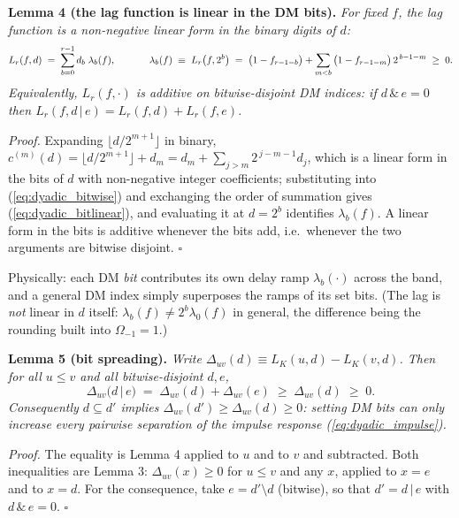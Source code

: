 \documentclass{article}
\numberwithin{equation}{section}   %
\begin{document}
\medskip
\par\noindent
{\bf Lemma 4 (the lag function is linear in the DM bits).}
{\em For fixed $f$, the lag function is a non-negative linear form in the binary digits of
$d$:}
\begin{equation}
L_r(f,d) \;=\; \sum_{b=0}^{r-1} d_b \; \lambda_b(f),
  \hspace{1.2cm}
\lambda_b(f) \;\equiv\; L_r\big(f, 2^b\big)
  \;=\; \big(1 - f_{r-1-b}\big) + \sum_{m<b} \big(1-f_{r-1-m}\big) \, 2^{\,b-1-m} \;\ge\; 0.
\label{eq:dyadic_bitlinear}
\end{equation}
{\em Equivalently, $L_r(f,\cdot)$ is additive on bitwise-disjoint DM indices: if
$d \,\&\, e = 0$ then $L_r(f, d\,|\,e) = L_r(f,d) + L_r(f,e)$.}

\medskip
\par\noindent
{\em Proof.} Expanding $\lfloor d/2^{m+1}\rfloor$ in binary,
$c^{(m)}(d) = \lfloor d/2^{m+1}\rfloor + d_m = d_m + \sum_{j>m} 2^{\,j-m-1} d_j$,
which is a linear form in the bits of $d$ with
non-negative integer coefficients; substituting into (\ref{eq:dyadic_bitwise}) and exchanging
the order of summation gives (\ref{eq:dyadic_bitlinear}), and evaluating it at $d = 2^b$
identifies $\lambda_b(f)$. A linear form in the bits is additive whenever the bits add, i.e.\
whenever the two arguments are bitwise disjoint. $\square$

\medskip
\par\noindent
Physically: each DM {\em bit} contributes its own delay ramp $\lambda_b(\cdot)$ across the
band, and a general DM index simply superposes the ramps of its set bits. (The lag is
{\em not} linear in $d$ itself: $\lambda_b(f) \ne 2^b \lambda_0(f)$ in general, the difference
being the rounding built into $\Omega_{-1}=1$.)

\medskip
\par\noindent
{\bf Lemma 5 (bit spreading).}
{\em Write $\Delta_{uv}(d) \equiv L_K(u,d) - L_K(v,d)$. Then for all $u \le v$ and all
bitwise-disjoint $d, e$,}
\begin{equation}
\Delta_{uv}\big( d \,|\, e \big) \;=\; \Delta_{uv}(d) + \Delta_{uv}(e) \;\ge\; \Delta_{uv}(d)
  \;\ge\; 0 .
\label{eq:dyadic_spread}
\end{equation}
{\em Consequently $d \subseteq d'$ implies $\Delta_{uv}(d') \ge \Delta_{uv}(d) \ge 0$: setting
DM bits can only increase every pairwise separation of the impulse response
(\ref{eq:dyadic_impulse}).}

\medskip
\par\noindent
{\em Proof.} The equality is Lemma 4 applied to $u$ and to $v$ and subtracted. Both
inequalities are Lemma 3: $\Delta_{uv}(x) \ge 0$ for $u \le v$ and any $x$, applied to
$x = e$ and to $x = d$. For the consequence, take $e = d' \setminus d$ (bitwise), so that
$d' = d \,|\, e$ with $d \,\&\, e = 0$. $\square$
\end{document}
